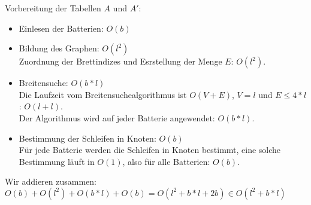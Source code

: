 \documentclass[a4paper,10pt,ngerman]{scrartcl}
\begin{document}
Vorbereitung der Tabellen $A$ und $A'$:
\begin{itemize}
  \item Einlesen der Batterien: $O(b)$
  \item Bildung des Graphen: $O(l^2)$\\
  Zuordnung der Brettindizes und Esrstellung der Menge $E$: $O(l^2)$.
  \item Breitensuche: $O(b*l)$\\
  Die Laufzeit vom Breitensuchealgorithmus ist $O(V + E)$,\cite{cormen:BFS}  $V = l$ und $E \leqslant 4*l$: $O(l+l)$.\\
  Der Algorithmus wird auf jeder Batterie angewendet: $O(b*l)$.
  \item Bestimmung der Schleifen in Knoten: $O(b)$\\
  Für jede Batterie werden die Schleifen in Knoten bestimmt, eine solche Bestimmung läuft in $O(1)$,
  also für alle Batterien: $O(b)$.
\end{itemize}

Wir addieren zusammen:\\
$O(b) + O(l^2) + O(b*l) + O(b) = O(l^2 + b*l + 2b) \in O(l^2 + b*l)$\\
\end{document}
